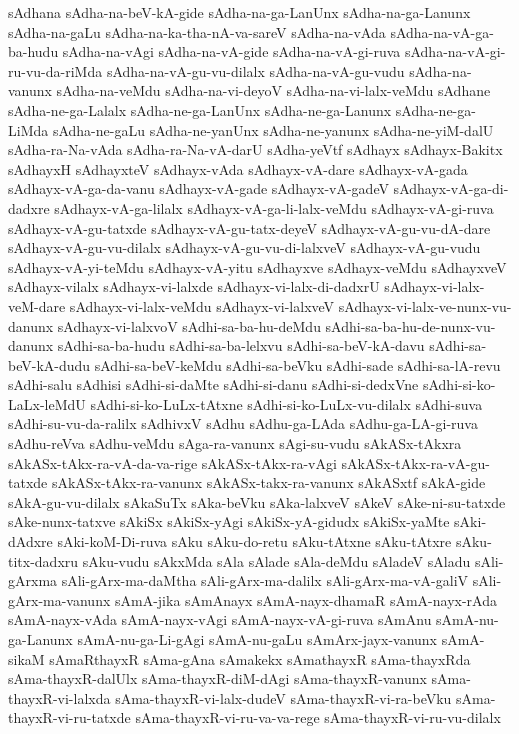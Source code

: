 {sAdhana
sAdha-na-beV-kA-gide
sAdha-na-ga-LanUnx
sAdha-na-ga-Lanunx
sAdha-na-gaLu
sAdha-na-ka-tha-nA-va-sareV
sAdha-na-vAda
sAdha-na-vA-ga-ba-hudu
sAdha-na-vAgi
sAdha-na-vA-gide
sAdha-na-vA-gi-ruva
sAdha-na-vA-gi-ru-vu-da-riMda
sAdha-na-vA-gu-vu-dilalx
sAdha-na-vA-gu-vudu
sAdha-na-vanunx
sAdha-na-veMdu
sAdha-na-vi-deyoV
sAdha-na-vi-lalx-veMdu
sAdhane
sAdha-ne-ga-Lalalx
sAdha-ne-ga-LanUnx
sAdha-ne-ga-Lanunx
sAdha-ne-ga-LiMda
sAdha-ne-gaLu
sAdha-ne-yanUnx
sAdha-ne-yanunx
sAdha-ne-yiM-dalU
sAdha-ra-Na-vAda
sAdha-ra-Na-vA-darU
sAdha-yeVtf
sAdhayx
sAdhayx-Bakitx
sAdhayxH
sAdhayxteV
sAdhayx-vAda
sAdhayx-vA-dare
sAdhayx-vA-gada
sAdhayx-vA-ga-da-vanu
sAdhayx-vA-gade
sAdhayx-vA-gadeV
sAdhayx-vA-ga-di-dadxre
sAdhayx-vA-ga-lilalx
sAdhayx-vA-ga-li-lalx-veMdu
sAdhayx-vA-gi-ruva
sAdhayx-vA-gu-tatxde
sAdhayx-vA-gu-tatx-deyeV
sAdhayx-vA-gu-vu-dA-dare
sAdhayx-vA-gu-vu-dilalx
sAdhayx-vA-gu-vu-di-lalxveV
sAdhayx-vA-gu-vudu
sAdhayx-vA-yi-teMdu
sAdhayx-vA-yitu
sAdhayxve
sAdhayx-veMdu
sAdhayxveV
sAdhayx-vilalx
sAdhayx-vi-lalxde
sAdhayx-vi-lalx-di-dadxrU
sAdhayx-vi-lalx-veM-dare
sAdhayx-vi-lalx-veMdu
sAdhayx-vi-lalxveV
sAdhayx-vi-lalx-ve-nunx-vu-danunx
sAdhayx-vi-lalxvoV
sAdhi-sa-ba-hu-deMdu
sAdhi-sa-ba-hu-de-nunx-vu-danunx
sAdhi-sa-ba-hudu
sAdhi-sa-ba-lelxvu
sAdhi-sa-beV-kA-davu
sAdhi-sa-beV-kA-dudu
sAdhi-sa-beV-keMdu
sAdhi-sa-beVku
sAdhi-sade
sAdhi-sa-lA-revu
sAdhi-salu
sAdhisi
sAdhi-si-daMte
sAdhi-si-danu
sAdhi-si-dedxVne
sAdhi-si-ko-LaLx-leMdU
sAdhi-si-ko-LuLx-tAtxne
sAdhi-si-ko-LuLx-vu-dilalx
sAdhi-suva
sAdhi-su-vu-da-ralilx
sAdhivxV
sAdhu
sAdhu-ga-LAda
sAdhu-ga-LA-gi-ruva
sAdhu-reVva
sAdhu-veMdu
sAga-ra-vanunx
sAgi-su-vudu
sAkASx-tAkxra
sAkASx-tAkx-ra-vA-da-va-rige
sAkASx-tAkx-ra-vAgi
sAkASx-tAkx-ra-vA-gu-tatxde
sAkASx-tAkx-ra-vanunx
sAkASx-takx-ra-vanunx
sAkASxtf
sAkA-gide
sAkA-gu-vu-dilalx
sAkaSuTx
sAka-beVku
sAka-lalxveV
sAkeV
sAke-ni-su-tatxde
sAke-nunx-tatxve
sAkiSx
sAkiSx-yAgi
sAkiSx-yA-gidudx
sAkiSx-yaMte
sAki-dAdxre
sAki-koM-Di-ruva
sAku
sAku-do-retu
sAku-tAtxne
sAku-tAtxre
sAku-titx-dadxru
sAku-vudu
sAkxMda
sAla
sAlade
sAla-deMdu
sAladeV
sAladu
sAli-gArxma
sAli-gArx-ma-daMtha
sAli-gArx-ma-dalilx
sAli-gArx-ma-vA-galiV
sAli-gArx-ma-vanunx
sAmA-jika
sAmAnayx
sAmA-nayx-dhamaR
sAmA-nayx-rAda
sAmA-nayx-vAda
sAmA-nayx-vAgi
sAmA-nayx-vA-gi-ruva
sAmAnu
sAmA-nu-ga-Lanunx
sAmA-nu-ga-Li-gAgi
sAmA-nu-gaLu
sAmArx-jayx-vanunx
sAmA-sikaM
sAmaRthayxR
sAma-gAna
sAmakekx
sAmathayxR
sAma-thayxRda
sAma-thayxR-dalUlx
sAma-thayxR-diM-dAgi
sAma-thayxR-vanunx
sAma-thayxR-vi-lalxda
sAma-thayxR-vi-lalx-dudeV
sAma-thayxR-vi-ra-beVku
sAma-thayxR-vi-ru-tatxde
sAma-thayxR-vi-ru-va-va-rege
sAma-thayxR-vi-ru-vu-dilalx
}

